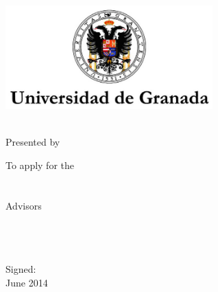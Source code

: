 \begin{titlepage}
    \begin{center}
        \large
        \vspace*{1.5cm}
        \includegraphics[width=8cm]{gfx/ugr_formal} \\

        \vspace{1.5cm}

        {\color{ugrOrange}\spacedallcaps{\myTitle}} \\ \bigskip
	{\textcolor{ugrGray} {\small Presented by}} \\ \bigskip
        \spacedlowsmallcaps{\myName}

        \vspace{1.5cm}
\textcolor{ugrGray}
        {\small To apply for the }\normalsize\\
        \large{} \\ 
        \large{} \\
\vspace{1.5cm}
\textcolor{ugrGray}{\small Advisors }\normalsize\\
        \large\spacedlowsmallcaps{\myDirectorOne}\\
        \large\spacedlowsmallcaps{\myDirectorTwo}\\
        \large\spacedlowsmallcaps{\myDirectorThree}\\
        \vspace{3cm}

        {\small Signed: \myName }\\ \bigskip
	June 2014


    \end{center}
\end{titlepage}   
